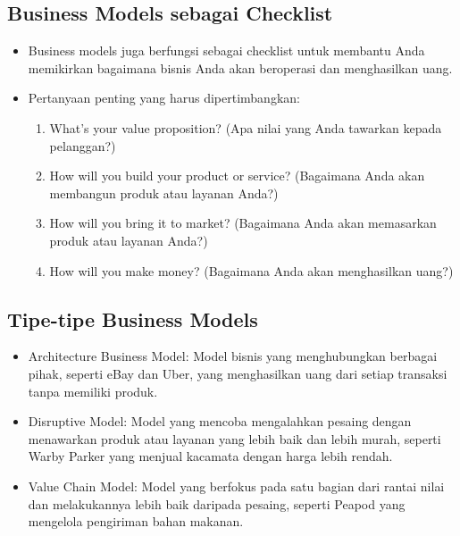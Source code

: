 \documentclass{article}
\begin{document}
\subsection{Business Models sebagai Checklist}
\begin{itemize}
    \item Business models juga berfungsi sebagai checklist untuk membantu Anda memikirkan bagaimana bisnis Anda akan beroperasi dan menghasilkan uang.
    \item Pertanyaan penting yang harus dipertimbangkan:
          \begin{enumerate}
              \item What’s your value proposition? (Apa nilai yang Anda tawarkan kepada pelanggan?)
              \item How will you build your product or service? (Bagaimana Anda akan membangun produk atau layanan Anda?)
              \item How will you bring it to market? (Bagaimana Anda akan memasarkan produk atau layanan Anda?)
              \item How will you make money? (Bagaimana Anda akan menghasilkan uang?)
          \end{enumerate}
\end{itemize}

\subsection{Tipe-tipe Business Models}
\begin{itemize}
    \item Architecture Business Model: Model bisnis yang menghubungkan berbagai pihak, seperti eBay dan Uber, yang menghasilkan uang dari setiap transaksi tanpa memiliki produk.
    \item Disruptive Model: Model yang mencoba mengalahkan pesaing dengan menawarkan produk atau layanan yang lebih baik dan lebih murah, seperti Warby Parker yang menjual kacamata dengan harga lebih rendah.
    \item Value Chain Model: Model yang berfokus pada satu bagian dari rantai nilai dan melakukannya lebih baik daripada pesaing, seperti Peapod yang mengelola pengiriman bahan makanan.
\end{itemize}
\end{document}
